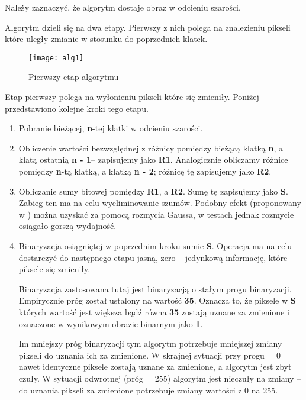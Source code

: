 Należy zaznaczyć, że algorytm dostaje obraz w odcieniu szarości. 

Algorytm dzieli się na dwa etapy. Pierwszy z nich polega na znalezieniu pikseli które uległy zmianie w stosunku do poprzednich klatek.

\begin{figure}[h]
	\centering
	\texttt{[image: alg1]}
	\caption{Pierwszy etap algorytmu}
	\label{fig:pierwszy_etap_alg}
\end{figure}

Etap pierwszy polega na wyłonieniu pikseli które się zmieniły. Poniżej przedstawiono kolejne kroki tego etapu.
\begin{enumerate}
	\item Pobranie bieżącej, {\bf n}-tej klatki w odcieniu szarości.
	
	\item Obliczenie wartości bezwzględnej z różnicy pomiędzy bieżącą klatką {\bf n}, a klatą ostatnią {\bf n - 1}-- zapisujemy jako {\bf R1}. Analogicznie obliczamy różnice pomiędzy {\bf n}-tą klatką, a klatką {\bf n - 2}; różnicę tę zapisujemy jako {\bf R2}.
	
	\item Obliczanie sumy bitowej pomiędzy {\bf R1}, a {\bf R2}. Sumę tę zapisujemy jako {\bf S}. Zabieg ten ma na celu wyeliminowanie szumów. Podobny efekt (proponowany w \cite{Motiondet}) można uzyskać za pomocą rozmycia Gaussa, w testach jednak rozmycie osiągało gorszą wydajność. 
	
	\item Binaryzacja osiągniętej w poprzednim kroku sumie {\bf S}. Operacja ma na celu dostarczyć do następnego etapu jasną, zero -- jedynkową informację, które piksele się zmieniły. 
	
	Binaryzacja zastosowana tutaj jest binaryzacją o stałym progu binaryzacji. Empirycznie próg został ustalony na wartość {\bf 35}. Oznacza to, że piksele w {\bf S} których wartość jest większa bądź równa {\bf 35} zostają uznane za zmienione i oznaczone w wynikowym obrazie binarnym jako {\bf 1}. 
	
	Im mniejszy próg binaryzacji tym algorytm potrzebuje mniejszej zmiany pikseli do uznania ich za zmienione. W skrajnej sytuacji przy progu = 0 nawet identyczne piksele zostają uznane za zmienione, a algorytm jest zbyt czuły. W sytuacji odwrotnej (próg = 255) algorytm jest nieczuły na zmiany -- do uznania pikseli za zmienione potrzebuje zmiany wartości z 0 na 255. 
\end{enumerate}

